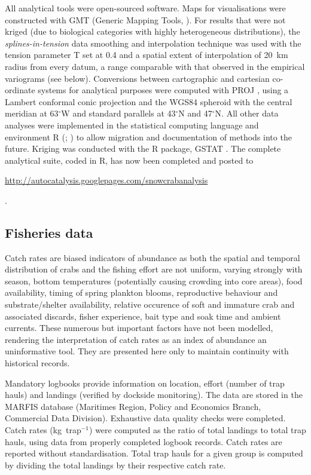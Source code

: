 \documentclass[11pt]{article}
\begin{document}
All analytical tools were open-sourced software. Maps for visualisations were constructed with GMT (Generic Mapping Tools, \citealt[version 4.1]{wessel1998}). For results that were not kriged (due to biological categories with highly heterogeneous distributions), the \textit{splines-in-tension} data smoothing and interpolation technique was used with the tension parameter T set at 0.4 and a spatial extent of interpolation of 20~km radius from every datum, a range comparable with that observed in the empirical variograms (see below). Conversions between cartographic and cartesian co-ordinate systems for analytical purposes were computed with PROJ \citep[version~4.4.9]{evenden1995}, using a Lambert conformal conic projection and the WGS84 spheroid with the central meridian at 63$^\circ$W and standard parallels at 43$^\circ$N and 47$^\circ$N. All other data analyses were implemented in the statistical computing language and environment R (\citealt[version~2.4.1]{R2007}; \citealt{venebles2002}) to allow migration and documentation of methods into the future. Kriging was conducted with the R package, GSTAT \citep[version~0.9-35]{pebesma2007}. The complete analytical suite, coded in R, has now been completed and posted to \begin{small} \url{http://autocatalysis.googlepages.com/snowcrabanalysis} \end{small}. 


\subsection{Fisheries data}

Catch rates are biased indicators of abundance as both the spatial and temporal distribution of crabs and the fishing effort are not uniform, varying strongly with season, bottom temperatures (potentially causing crowding into core areas), food availability, timing of spring plankton blooms, reproductive behaviour and substrate/shelter availability, relative occurence of soft and immature crab and associated discards, fisher experience, bait type and soak time and ambient currents. These numerous but important factors have not been modelled, rendering the interpretation of catch rates as an index of abundance an uninformative tool. They are presented here only to maintain continuity with historical records. 

Mandatory logbooks provide information on location, effort (number of trap hauls) and landings (verified by dockside monitoring). The data are stored in the MARFIS database (Maritimes Region, Policy and Economics Branch, Commercial Data Division). Exhaustive data quality checks were completed. Catch rates (kg~trap$^{-1}$) were computed as the ratio of total landings to total trap hauls, using data from properly completed logbook records. Catch rates are reported without standardisation. Total trap hauls for a given group is computed by dividing the total landings by their respective catch rate.
\end{document}
